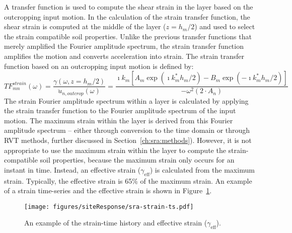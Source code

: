 \documentclass[12pt,oneside]{book}
\begin{document}
A transfer function is used to compute the shear strain in the layer based on the outcropping input
motion.  In the calculation of the strain transfer function, the shear strain is computed at the middle of
the layer ($z=h_m/2$) and used to select the strain compatible soil properties.  Unlike the previous
transfer functions that merely amplified the Fourier amplitude spectrum, the strain transfer
function amplifies the motion and converts acceleration into strain.
The strain transfer function based on an outcropping input motion is defined by:
\begin{equation}
    TF_{mn}^{strain}(\omega) = \frac{\gamma(\omega, z=h_m/2)}{\ddot{u}_{n,outcrop}(\omega)} =
    \frac{\imath k_m \left[
        A_m \exp\left( \imath k_m^* h_m / 2 \right) - B_m \exp\left( -\imath k_m^* h_m / 2 \right) \right]
    }{-\omega^2 \left( 2 \cdot A_n \right)}
    \label{eq:strain_tf}
\end{equation}
The strain Fourier amplitude spectrum within a layer is calculated by applying the strain transfer
function to the Fourier amplitude spectrum of the input motion.  The maximum strain within the layer
is derived from this Fourier amplitude spectrum -- either through conversion to the time domain or
through RVT methods, further discussed in Section~\ref{ch:sra:methods}).  However, it is
not appropriate to use the maximum strain within the layer to compute the strain-compatible soil
properties, because the maximum strain only occurs for an instant in time.  Instead, an effective
strain ($\gamma_{\mathrm{eff}}$) is calculated from the maximum strain.  Typically, the effective
strain is 65\% of the maximum strain. An example of a strain time-series and the effective strain is
shown in Figure~\ref{fig:siteResponse:strainTH}.

\begin{figure}[tb]
    \begin{center}
        \texttt{[image: figures/siteResponse/sra-strain-ts.pdf]}
    \end{center}
    \caption{An example of the strain-time history and effective strain ($\gamma_{\mathrm{eff}}$).}
    \label{fig:siteResponse:strainTH}
\end{figure}
\end{document}
